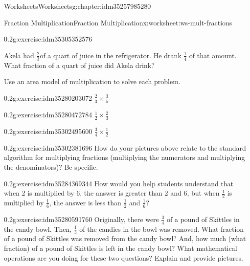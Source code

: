 \documentclass[twoside,11pt,]{book}
\begin{document}
\begin{chapterptx}{Worksheets}{}{Worksheets}{}{}{g:chapter:idm35257985280}
\begin{worksheet-section-numberless}{Fraction Multiplication}{}{Fraction Multiplication}{}{}{x:worksheet:ws-mult-fractions}
\begin{divisionexercise}{6}{}{0.2}{g:exercise:idm35305352576}
\par
Akela had \(\frac{2}{3} \)of a quart of juice in the refrigerator.  He drank \(\frac{1}{4} \) of that amount. What fraction of a quart of juice did Akela drink?%
\end{divisionexercise}%
\begin{introduction}{}%
Use an area model of multiplication to solve each problem.%
\end{introduction}%
\begin{divisionexercise}{7}{}{0.2}{g:exercise:idm35280203072}%
\(\frac{2}{3} \times \frac{3}{5} \)%
\end{divisionexercise}%
\begin{divisionexercise}{8}{}{0.2}{g:exercise:idm35280472784}%
\(\frac{1}{2} \times \frac{2}{3} \)%
\end{divisionexercise}%
\clearpage
\begin{divisionexercise}{9}{}{0.2}{g:exercise:idm35302495600}%
\(\frac{3}{4} \times \frac{1}{2} \)%
\end{divisionexercise}%
\begin{divisionexercise}{10}{}{0.2}{g:exercise:idm35302381696}%
How do your pictures above relate to the standard algorithm for multiplying fractions (multiplying the numerators and multiplying the denominators)? Be specific.%
\end{divisionexercise}%
\begin{divisionexercise}{11}{}{0.2}{g:exercise:idm35284369344}%
How would you help students understand that when 2 is multiplied by 6, the answer is greater than 2 and 6, but when \(\frac{1}{2} \) is multiplied by \(\frac{1}{6} \), the answer is less than \(\frac{1}{2} \) and \(\frac{1}{6} \)?%
\end{divisionexercise}%
\clearpage
\begin{divisionexercise}{12}{}{0.2}{g:exercise:idm35280591760}%
Originally, there were \(\frac{3}{4} \) of a pound of Skittles in the candy bowl. Then, \(\frac{1}{3} \) of the candies in the bowl was removed. What fraction of a pound of Skittles was removed from the candy bowl? And, how much (what fraction) of a pound of Skittles is left in the candy bowl? What mathematical operations are you doing for these two questions? Explain and provide pictures.%
\end{divisionexercise}%
\end{worksheet-section-numberless}
\restoregeometry
%
%
\typeout{************************************************}
\typeout{************************************************}

\end{chapterptx}
\end{document}
